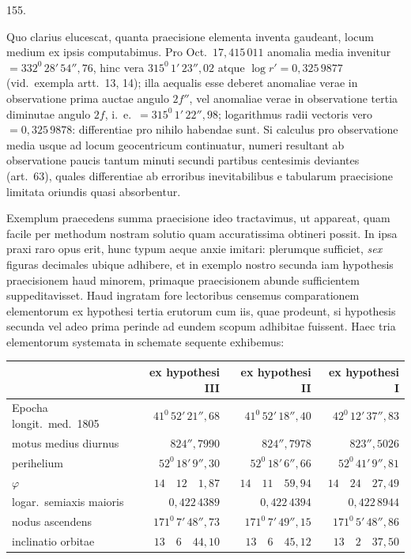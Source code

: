 \par{}\medskip
\hypertarget{native-209-article155}{}
\begin{center}155.\end{center}
Quo clarius elucescat, quanta praecisione elementa inventa gaudeant, locum medium ex ipsis computabimus. Pro Oct.\ $17{,}415\,011$ anomalia media invenitur $=332^{0}\,28'\,54''{,}76$, hinc vera $315^{0}\,1'\,23''{,}02$ atque $\log r'=0{,}325\,9877$ (vid.\ exempla artt.\ 13, 14); illa aequalis esse deberet anomaliae verae in observatione prima auctae angulo $2f''$, vel anomaliae verae in observatione tertia diminutae angulo $2f$, i.\ e.\ $=315^{0}\,1'\,22''{,}98$; logarithmus radii vectoris vero $=0{,}325\,9878$: differentiae pro nihilo habendae sunt. Si calculus pro observatione media usque ad locum geocentricum continuatur, numeri resultant ab observatione paucis tantum minuti secundi partibus centesimis deviantes (art.\ 63), quales differentiae ab erroribus inevitabilibus e tabularum praecisione limitata oriundis quasi absorbentur.

Exemplum praecedens summa praecisione ideo tractavimus, ut appareat, quam facile per methodum nostram solutio quam accuratissima obtineri possit. In ipsa praxi raro opus erit, hunc typum aeque anxie imitari: plerumque sufficiet, \textit{sex} figuras decimales ubique adhibere, et in exemplo nostro secunda iam hypothesis praecisionem haud minorem, primaque praecisionem abunde sufficientem suppeditavisset. Haud ingratam fore lectoribus censemus comparationem elementorum ex hypothesi tertia erutorum cum iis, quae prodeunt, si hypothesis secunda vel adeo prima perinde ad eundem scopum adhibitae fuissent. Haec tria elementorum systemata in schemate sequente exhibemus:
\begin{center}
\begingroup\footnotesize\setlength{\tabcolsep}{2pt}\renewcommand{\arraystretch}{1.2}
\begin{tabular}{|p{1.35in}|r|r|r|}\hline
& ex hypothesi III & ex hypothesi II & ex hypothesi I\\\hline
Epocha longit.\ med.\ 1805 & $41^{0}\,52'\,21''{,}68$ & $41^{0}\,52'\,18''{,}40$ & $42^{0}\,12'\,37''{,}83$\\
motus medius diurnus & $824''{,}7990$ & $824''{,}7978$ & $823''{,}5026$\\
perihelium & $52^{0}\,18'\,9''{,}30$ & $52^{0}\,18'\,6''{,}66$ & $52^{0}\,41'\,9''{,}81$\\
$\varphi$ & $14\quad12\quad1{,}87$ & $14\quad11\quad59{,}94$ & $14\quad24\quad27{,}49$\\
logar.\ semiaxis maioris & $0{,}422\,4389$ & $0{,}422\,4394$ & $0{,}422\,8944$\\
nodus ascendens & $171^{0}\,7'\,48''{,}73$ & $171^{0}\,7'\,49''{,}15$ & $171^{0}\,5'\,48''{,}86$\\
inclinatio orbitae & $13\quad6\quad44{,}10$ & $13\quad6\quad45{,}12$ & $13\quad2\quad37{,}50$\\\hline
\end{tabular}\endgroup
\end{center}

